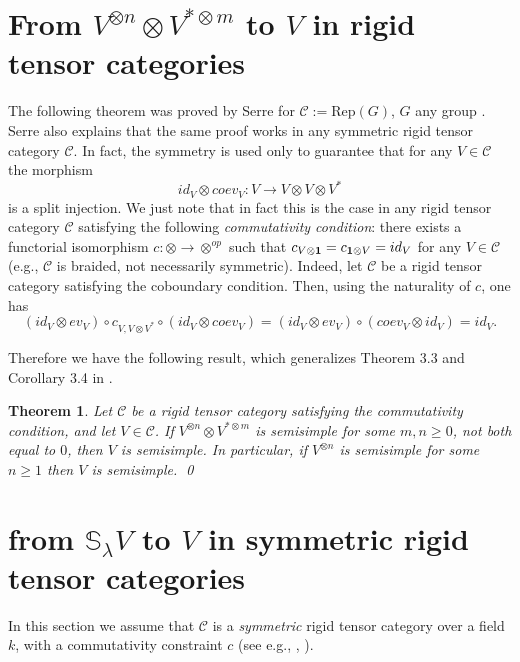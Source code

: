 \documentclass{amsart}
\newtheorem{theorem}{Theorem}[section]
\theoremstyle{definition}
\newcommand{\Rep}{\text{Rep}}
\newcommand{\ot}{\otimes}
\newcommand{\C}{{\mathcal C}}
\newcommand{\unit}{{\bf 1}}
\begin{document}
\section{From $V^{\otimes n}\otimes V^{*\otimes m}$ to $V$ in rigid
tensor categories}

The following theorem was proved by Serre for
$\mathcal{C}:=\Rep(G)$, $G$ any group \cite{s1}. Serre also explains
that the same proof works in any symmetric rigid tensor category
$\C$. In fact, the symmetry is used only to guarantee that for any
$V\in \mathcal{C}$ the morphism
$$id_V\ot coev_V:V\to V\otimes V\otimes V^*$$ is a split injection.
We just note that in fact this is the case in any rigid tensor
category $\C$ satisfying the following {\em commutativity
condition}: there exists a functorial isomorphism $c: \otimes\to
\otimes^{op}$ such that $c_{V\ot\unit}=c_{\unit\ot V}=id_V$ for any
$V\in \C$ (e.g., $\C$ is braided, not necessarily symmetric).
Indeed, let $\C$ be a rigid tensor category satisfying the
coboundary condition. Then, using the naturality of $c$, one has
\begin{equation}\label{yan}
(id_V\otimes ev_V)\circ c_{V,V\ot V^*}\circ (id_V\ot
coev_V)=(id_V\otimes ev_V)\circ (coev_V\ot id_V)=id_V.
\end{equation}

Therefore we have the following result, which generalizes Theorem
3.3 and Corollary 3.4 in \cite{s1}.

\begin{theorem}\label{tensor}
Let $\C$ be a rigid tensor category satisfying the commutativity
condition, and let $V\in \C$. If $V^{\otimes n}\otimes V^{*\otimes
m}$ is semisimple for some $m,n\ge 0$, not both equal to $0$, then
$V$ is semisimple. In particular, if $V^{\otimes n}$ is semisimple
for some $n\ge 1$ then $V$ is semisimple. \qed
\end{theorem}

\section{from $\mathbb{S}_{\lambda}V$
to $V$ in symmetric rigid tensor categories}

In this section we assume that $\C$ is a {\em symmetric} rigid
tensor category over a field $k$, with a commutativity constraint
$c$ (see e.g., \cite{d1}, \cite{d2}).
\end{document}
